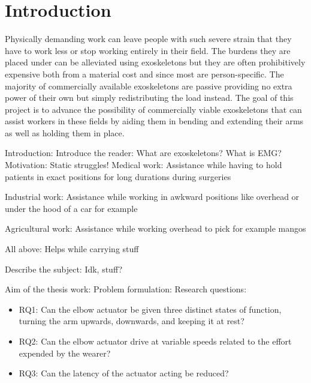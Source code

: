 \section{Introduction}
\label{section:intro}

Physically demanding work can leave people with such severe strain that they have to work less or stop working entirely in 
their field\cite{WorkDemands}. The burdens they are placed under can be alleviated using exoskeletons but they are often 
prohibitively expensive both from a material cost and since most are person-specific. The majority of commercially available 
exoskeletons are passive providing no extra power of their own but simply redistributing the load instead. The goal of this 
project is to advance the possibility of commercially viable exoskeletons that can assist workers in these fields by aiding 
them in bending and extending their arms as well as holding them in place.

Introduction:
    Introduce the reader: %
        What are exoskeletons?
        What is EMG?
    Motivation: %
        Static struggles!
            Medical work:
                Assistance while having to hold patients in exact positions for long durations during surgeries

            Industrial work:
                Assistance while working in awkward positions like overhead or under the hood of a car for example

            Agricultural work:
                Assistance while working overhead to pick for example mangos
            
            All above:
                Helps while carrying stuff

    Describe the subject: %
        Idk, stuff?

    Aim of the thesis work: %
        Problem formulation: %
            Research questions:
            \begin{itemize}
                 
                \item RQ1: Can the elbow actuator be given three distinct states of function, turning the arm upwards, downwards, and keeping it at rest?

                \item RQ2: Can the elbow actuator drive at variable speeds related to the effort expended by the wearer?

                \item RQ3: Can the latency of the actuator acting be reduced?

            \end{itemize}

